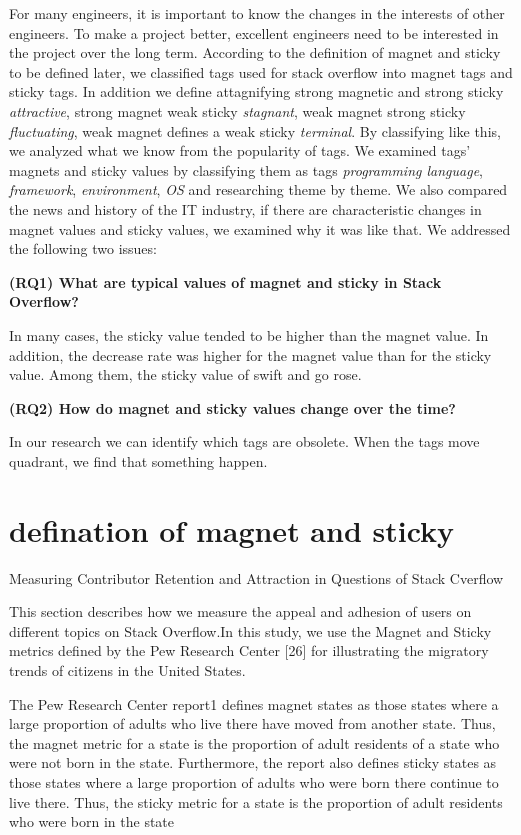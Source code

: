 \documentclass[conference]{IEEEtran}
\begin{document}
\smallskip
For many engineers, it is important to know the changes in the interests of other engineers. To make a project better, excellent engineers need to be interested in the project over the long term. According to the definition of magnet and sticky to be defined later, we classified tags used for stack overflow into magnet tags and sticky tags. In addition we define attagnifying strong magnetic and strong sticky \emph{attractive}, strong magnet weak sticky \emph{stagnant}, weak magnet strong sticky \emph{fluctuating}, weak magnet defines a weak sticky \emph{terminal}. By classifying like this, we analyzed what we know from the popularity of tags. We examined tags' magnets and sticky values by classifying them as tags \emph{programming language}, \emph{framework}, \emph{environment}, \emph{OS} and researching theme by theme. We also compared the news and history of the IT industry, if there are characteristic changes in magnet values and sticky values, we examined why it was like that. We addressed the following two issues:
\par
\smallskip
\textbf{(RQ1) What are typical values of magnet and sticky in Stack Overflow?}\par
In many cases, the sticky value tended to be higher than the magnet value. In addition, the decrease rate was higher for the magnet value than for the sticky value. Among them, the sticky value of swift and go rose.

\textbf{(RQ2) How do magnet and sticky values change over the time?}\par
In our research we can identify which tags are obsolete. When the tags move quadrant, we find that something happen.

\section{defination of magnet and sticky}
Measuring Contributor Retention and Attraction in Questions of Stack Cverflow

This section describes how we measure the appeal and adhesion of users on different topics on Stack Overflow.In this study, we use the Magnet and Sticky metrics defined by the Pew Research Center [26] for illustrating the migratory trends of citizens in the United States.

The Pew Research Center report1 defines magnet states as those states where a large proportion of adults who live there have moved from another state. Thus, the magnet metric for a state is the proportion of adult residents of a state who were not born in the state. Furthermore, the report also defines sticky states as those states where a large proportion of adults who were born there continue to live there. Thus, the sticky metric for a state is the proportion of adult residents who were born in the state
\end{document}
